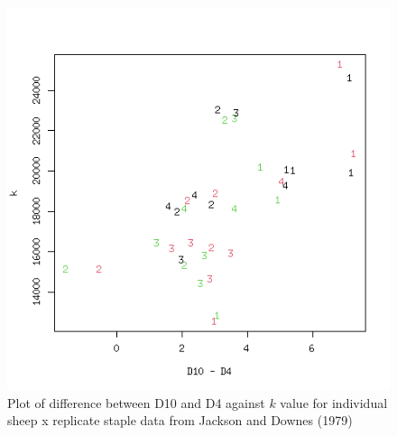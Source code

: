 %

\begin{figure}[h]
  \centering
   \includegraphics[width=1.1\textwidth]{SDP/d10md4xk.png}
  \caption{Plot of difference between D10 and D4 against $k$ value for individual sheep x replicate staple data from Jackson and Downes (1979)~\cite{jack:79}}
  \label{fig:d10md4xk}
\end{figure}

%

